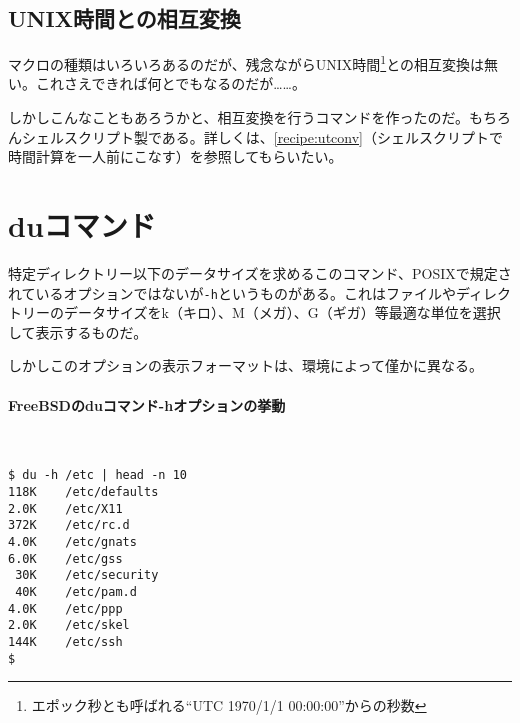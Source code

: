 \subsection*{UNIX時間との相互変換}

マクロの種類はいろいろあるのだが、残念ながらUNIX時間\footnote{エポック秒とも呼ばれる``UTC 1970/1/1 00:00:00''からの秒数}との相互変換は無い。これさえできれば何とでもなるのだが……。

しかしこんなこともあろうかと、相互変換を行うコマンドを作ったのだ。もちろんシェルスクリプト製である。詳しくは、\ref{recipe:utconv}（シェルスクリプトで時間計算を一人前にこなす）を参照してもらいたい。

\section{duコマンド}

特定ディレクトリー以下のデータサイズを求めるこのコマンド、POSIXで規定されているオプションではないが\verb|-h|というものがある。これはファイルやディレクトリーのデータサイズをk（キロ）、M（メガ）、G（ギガ）等最適な単位を選択して表示するものだ。

しかしこのオプションの表示フォーマットは、環境によって僅かに異なる。

\paragraph{FreeBSDのduコマンド-hオプションの挙動} 　\\
\begin{screen}
	\verb!$ du -h /etc | head -n 10! \return \\
	\verb|118K    /etc/defaults| \\
	\verb|2.0K    /etc/X11| \\
	\verb|372K    /etc/rc.d| \\
	\verb|4.0K    /etc/gnats| \\
	\verb|6.0K    /etc/gss| \\
	\verb| 30K    /etc/security| \\
	\verb| 40K    /etc/pam.d| \\
	\verb|4.0K    /etc/ppp| \\
	\verb|2.0K    /etc/skel| \\
	\verb|144K    /etc/ssh| \\
	\verb|$ |
\end{screen}

